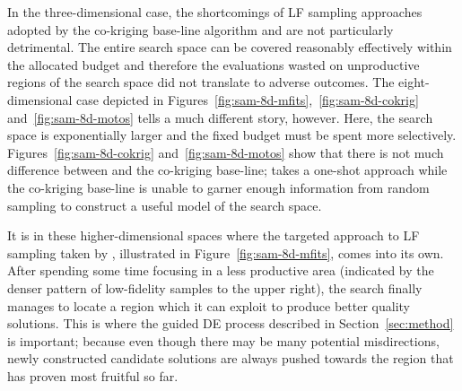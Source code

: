 In the three-dimensional case, the shortcomings of LF sampling approaches adopted by the co-kriging base-line algorithm and \motos{} are not particularly detrimental. The entire search space can be covered reasonably effectively within the allocated budget and therefore the evaluations wasted on unproductive regions of the search space did not translate to adverse outcomes. The eight-dimensional case depicted in Figures~\ref{fig:sam-8d-mfits},~\ref{fig:sam-8d-cokrig} and~\ref{fig:sam-8d-motos} tells a much different story, however. Here, the search space is exponentially larger and the fixed budget must be spent more selectively. Figures~\ref{fig:sam-8d-cokrig} and~\ref{fig:sam-8d-motos} show that there is not much difference between \motos{} and the co-kriging base-line; \motos{} takes a one-shot approach while the co-kriging base-line is unable to garner enough information from random sampling to construct a useful model of the search space. 

It is in these higher-dimensional spaces where the targeted approach to LF sampling taken by \AlgName{}, illustrated in Figure~\ref{fig:sam-8d-mfits}, comes into its own. After spending some time focusing in a less productive area (indicated by the denser pattern of low-fidelity samples to the upper right), the search finally manages to locate a region which it can exploit to produce better quality solutions. This is where the guided DE process described in Section~\ref{sec:method} is important; because even though there may be many potential misdirections, newly constructed candidate solutions are always pushed towards the region that has proven most fruitful so far.

